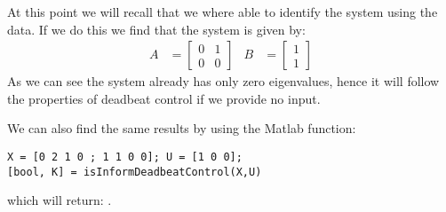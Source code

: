 At this point we will recall that we where able to identify the system using the data. If we do this we find that the system is given by:
\begin{align*}
A &= \begin{bmatrix}0&1\\0&0\end{bmatrix} & B &= \begin{bmatrix}1\\1\end{bmatrix}
\end{align*}
As we can see the system already has only zero eigenvalues, hence it will follow the properties of deadbeat control if we provide no input.

We can also find the same results by using the Matlab function:
\begin{lstlisting}
X = [0 2 1 0 ; 1 1 0 0]; U = [1 0 0];
[bool, K] = isInformDeadbeatControl(X,U)
\end{lstlisting}
which will return: \mon{[ 1, [0.5329e-14 -0.6217e-14] ]}.










